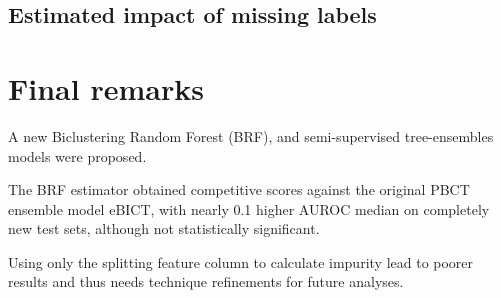 \subsection{Estimated impact of missing labels}


\section{Final remarks}

A new Biclustering Random Forest (BRF), and semi-supervised tree-ensembles models were proposed.

The BRF estimator obtained competitive scores against the original PBCT ensemble model eBICT, with nearly 0.1 higher AUROC median on completely new test sets, although not statistically significant.

Using only the splitting feature column to calculate impurity lead to poorer results and thus needs technique refinements for future analyses.

% 
% 
% 
% 
